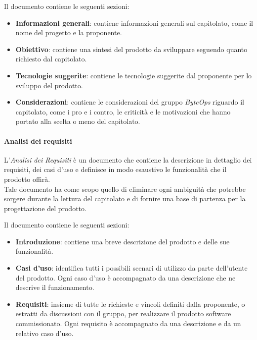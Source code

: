 Il documento contiene le seguenti sezioni:
\begin{itemize}
    \item \textbf{Informazioni generali}: contiene informazioni generali sul capitolato, come il nome del progetto e la proponente.
    \item \textbf{Obiettivo}: contiene una sintesi del prodotto da sviluppare seguendo quanto richiesto dal capitolato.
    \item \textbf{Tecnologie suggerite}: contiene le tecnologie suggerite dal proponente per lo sviluppo del prodotto.
    \item \textbf{Considerazioni}: contiene le considerazioni del gruppo \textit{ByteOps} riguardo il capitolato, come i pro e i contro, le criticità e le motivazioni che hanno portato alla scelta o meno del capitolato.
\end{itemize}

\paragraph{Analisi dei requisiti}
L'\textit{Analisi dei Requisiti} è un documento che contiene la descrizione in dettaglio dei requisiti, dei casi d'uso e definisce in modo esaustivo le funzionalità che il prodotto offirà.\\
Tale documento ha come scopo quello di eliminare ogni ambiguità che potrebbe sorgere durante la lettura del capitolato e di fornire una base di partenza per la progettazione del prodotto.

Il documento contiene le seguenti sezioni:

\begin{itemize}
    \item \textbf{Introduzione}: contiene una breve descrizione del prodotto e delle sue funzionalità.
    \item \textbf{Casi d'uso}: identifica tutti i possibili scenari di utilizzo da parte dell'utente del prodotto. Ogni caso d'uso è accompagnato da una descrizione che ne descrive il funzionamento.
    \item \textbf{Requisiti}: insieme di tutte le richieste e vincoli definiti dalla proponente, o estratti da discussioni con il gruppo, per realizzare il prodotto software commissionato. Ogni requisito è accompagnato da una descrizione e da un relativo caso d'uso.
\end{itemize}

